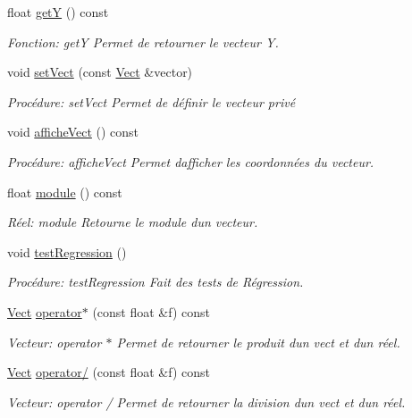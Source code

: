 \begin{DoxyCompactItemize}
float \hyperlink{classVect_a2e44111683aae147cd053ac6002f5992}{getY} () const
\begin{DoxyCompactList}\small\item\em Fonction\+: getY Permet de retourner le vecteur Y. \end{DoxyCompactList}\item 
void \hyperlink{classVect_a28408435bc900905d3416aef70140cd9}{set\+Vect} (const \hyperlink{classVect}{Vect} \&vector)
\begin{DoxyCompactList}\small\item\em Procédure\+: set\+Vect Permet de définir le vecteur privé \end{DoxyCompactList}\item 
void \hyperlink{classVect_a11f0af5e83cd9c4605c37e0b98eff8c0}{affiche\+Vect} () const
\begin{DoxyCompactList}\small\item\em Procédure\+: affiche\+Vect Permet d\textquotesingle{}afficher les coordonnées du vecteur. \end{DoxyCompactList}\item 
float \hyperlink{classVect_aa61c71b79a4d2f2cda092648a7268c4f}{module} () const
\begin{DoxyCompactList}\small\item\em Réel\+: module Retourne le module d\textquotesingle{}un vecteur. \end{DoxyCompactList}\item 
void \hyperlink{classVect_a734074001bba32f3d76e5cee612864f1}{test\+Regression} ()
\begin{DoxyCompactList}\small\item\em Procédure\+: test\+Regression Fait des tests de Régression. \end{DoxyCompactList}\item 
\hyperlink{classVect}{Vect} \hyperlink{classVect_a449279327576b48553f88bcaa5027d40}{operator$\ast$} (const float \&f) const
\begin{DoxyCompactList}\small\item\em Vecteur\+: operator $\ast$ Permet de retourner le produit d\textquotesingle{}un vect et d\textquotesingle{}un réel. \end{DoxyCompactList}\item 
\hyperlink{classVect}{Vect} \hyperlink{classVect_ada922ed2e27088a85db483e04d93492f}{operator/} (const float \&f) const
\begin{DoxyCompactList}\small\item\em Vecteur\+: operator / Permet de retourner la division d\textquotesingle{}un vect et d\textquotesingle{}un réel. \end{DoxyCompactList}\item 

\end{DoxyCompactItemize}
